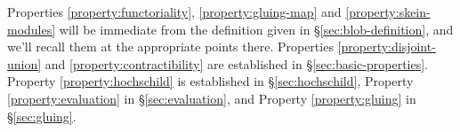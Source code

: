 Properties \ref{property:functoriality}, \ref{property:gluing-map} and \ref{property:skein-modules} will be immediate from the definition given in
\S \ref{sec:blob-definition}, and we'll recall them at the appropriate points there. 
Properties \ref{property:disjoint-union} and \ref{property:contractibility} are established in \S \ref{sec:basic-properties}.
Property \ref{property:hochschild} is established in \S \ref{sec:hochschild}, Property \ref{property:evaluation} in \S \ref{sec:evaluation},
and Property \ref{property:gluing} in \S \ref{sec:gluing}.
